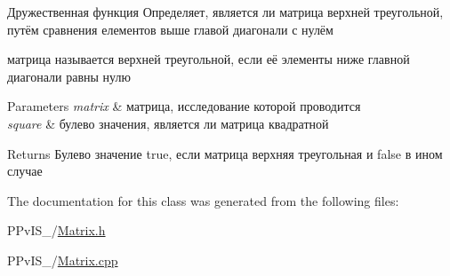 Дружественная функция Определяет, является ли матрица верхней треугольной, путём сравнения елементов выше главой диагонали с нулём 

матрица называется верхней треугольной, если её элементы ниже главной диагонали равны нулю 
\begin{DoxyParams}{Parameters}
{\em matrix} & матрица, исследование которой проводится \\
\hline
{\em square} & булево значения, является ли матрица квадратной \\
\hline
\end{DoxyParams}
\begin{DoxyReturn}{Returns}
Булево значение true, если матрица верхняя треугольная и false в ином случае 
\end{DoxyReturn}


The documentation for this class was generated from the following files\-:\begin{DoxyCompactItemize}
\item 
P\-Pv\-I\-S\-\_/\hyperlink{_matrix_8h}{Matrix.\-h}\item 
P\-Pv\-I\-S\-\_/\hyperlink{_matrix_8cpp}{Matrix.\-cpp}\end{DoxyCompactItemize}
